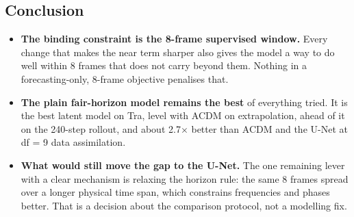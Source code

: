 \subsection{Conclusion}\label{sec:concl4}

\begin{itemize}
\item \textbf{The binding constraint is the 8-frame supervised window.} Every change that
  makes the near term sharper also gives the model a way to do well within 8 frames that
  does not carry beyond them. Nothing in a forecasting-only, 8-frame objective penalises
  that.
\item \textbf{The plain fair-horizon model remains the best} of everything tried. It is the
  best latent model on Tra, level with ACDM on extrapolation, ahead of it on the 240-step
  rollout, and about 2.7$\times$ better than ACDM and the U-Net at df = 9 data
  assimilation.
\item \textbf{What would still move the gap to the U-Net.} The one remaining lever with a
  clear mechanism is relaxing the horizon rule: the same 8 frames spread over a longer
  physical time span, which constrains frequencies and phases better. That is a decision
  about the comparison protocol, not a modelling fix.
\end{itemize}
